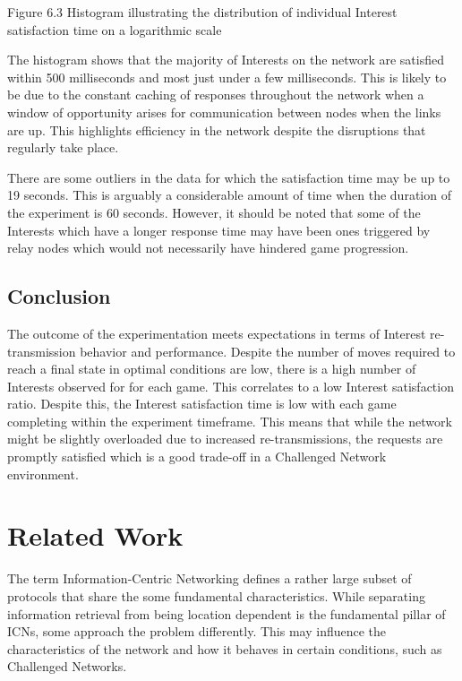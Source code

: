 \documentclass[a4paper,12pt]{report}      %
\begin{document}
\begin{center}Figure 6.3 Histogram illustrating the distribution of individual Interest satisfaction time on a logarithmic scale\end{center}

The histogram shows that the majority of Interests on the network are satisfied within 500 milliseconds
and most just under a few milliseconds. This is likely to be due to the constant caching of responses
throughout the network when a window of opportunity arises for communication between nodes when
the links are up. This highlights efficiency in the network despite the disruptions that regularly take
place.

There are some outliers in the data for which the satisfaction time may be up to 19 seconds. This is
arguably a considerable amount of time when the duration of the experiment is 60 seconds. However, it
should be noted that some of the Interests which have a longer response time may have been ones
triggered by relay nodes which would not necessarily have hindered game progression.

\section{Conclusion}

The outcome of the experimentation meets expectations in terms of Interest re-transmission behavior and performance.
Despite the number of moves required to reach a final state in optimal conditions are low, there is a high number of Interests observed for for each game.
This correlates to a low Interest satisfaction ratio. Despite this, the Interest satisfaction time is low with each game completing within the experiment timeframe.
This means that while the network might be slightly overloaded due to increased re-transmissions, the requests are promptly satisfied which is a good trade-off in a Challenged Network environment.

\pagebreak
\chapter{Related Work}

The term Information-Centric Networking defines a rather large subset of protocols that share the some
fundamental characteristics. While separating information retrieval from being location dependent is
the fundamental pillar of ICNs, some approach the problem differently. This may influence the
characteristics of the network and how it behaves in certain conditions, such as Challenged Networks.
\end{document}
